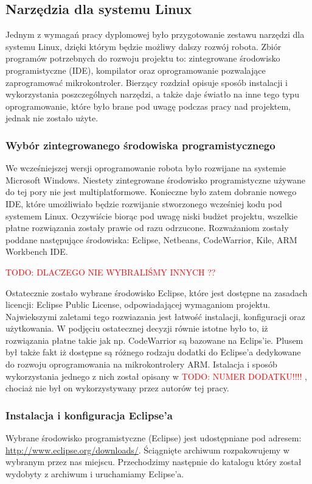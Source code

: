 \subsection{Narzędzia dla systemu Linux}
Jednym z wymagań pracy dyplomowej było przygotowanie zestawu narzędzi dla systemu
Linux, dzięki którym będzie możliwy dalszy rozwój robota. Zbiór programów
potrzebnych do rozwoju projektu to: zintegrowane środowisko programistyczne
(IDE), kompilator oraz oprogramowanie pozwalające zaprogramować mikrokontroler.
Bierzący rozdział opisuje sposób instalacji i wykorzystania poszczególnych
narzędzi, a także daje światło na inne tego typu oprogramowanie, które było brane
pod uwagę podczas pracy nad projektem, jednak nie zostało użyte.

\subsubsection{Wybór zintegrowanego środowiska programistycznego}
We wcześniejszej wersji oprogramowanie robota było rozwijane na systemie
Microsoft Windows. Niestety zintegrowane środowisko programistyczne używane do
tej pory nie jest multiplatformowe. Konieczne było zatem dobranie nowego IDE,
które umożliwiało będzie rozwijanie stworzonego wcześniej kodu pod systemem
Linux. Oczywiście biorąc pod uwagę niski budżet projektu, wszelkie płatne
rozwiązania zostały prawie  od razu odrzucone. Rozważaniom zostały poddane
następujące środowiska: Eclipse, Netbeans, CodeWarrior, Kile, ARM Workbench IDE.

\textcolor{red}{TODO: DLACZEGO NIE WYBRALIŚMY INNYCH ??}

Ostatecznie zostało wybrane środowisko Eclipse, które jest dostępne na zasadach
licencji: Eclipse Public License, odpowiadającej wymaganiom projektu.
Najwiekszymi zaletami tego rozwiazania jest łatwość instalacji, konfiguracji oraz
użytkowania. W podjęciu ostatecznej decyzji równie istotne było to, iż
rozwiązania płatne takie jak np. CodeWarrior są bazowane na Eclips'ie. Plusem był
także fakt iż dostępne są różnego rodzaju dodatki do Eclipse'a dedykowane do
rozwoju oprogramowania na mikrokontrolery ARM. Istalacja i sposób wykorzystania
jednego z nich został opisany w \textcolor{red}{ TODO: NUMER DODATKU!!!! },
chociaż nie był on wykorzystywany przez autorów tej pracy.

\subsubsection{Instalacja i konfiguracja Eclipse'a}
Wybrane środowisko programistyczne (Eclipse) jest udostępniane pod adresem:
\url{http://www.eclipse.org/downloads/}. Ściągnięte archiwum rozpakowujemy w
wybranym przez nas miejscu. Przechodzimy następnie do katalogu który został
wydobyty z archiwum i uruchamiamy Eclipse'a.

